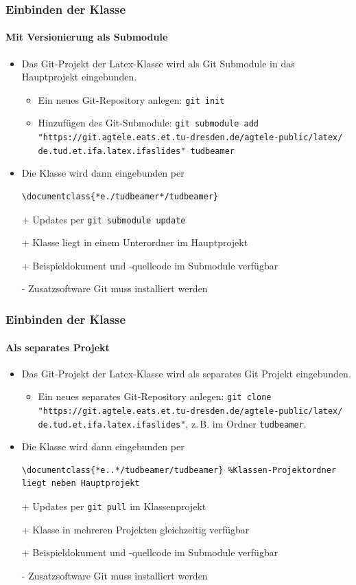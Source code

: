 \documentclass[german,notoc]{tudbeamer}%
\begin{document}
\begin{frame}[fragile]
	\frametitle{Einbinden der Klasse}
	\framesubtitle{Mit Versionierung als Submodule}
	\begin{itemize}
		\item Das Git-Projekt der Latex-Klasse wird als Git Submodule in das Hauptprojekt eingebunden.
		\begin{itemize}
			\item Ein neues Git-Repository anlegen: \texttt{git init}
			\item Hinzufügen des Git-Submodule: \texttt{git submodule add "https://git.agtele.eats.et.tu-dresden.de/agtele-public/latex/ de.tud.et.ifa.latex.ifaslides" tudbeamer}
		\end{itemize}
		\item Die Klasse wird dann eingebunden per
			\begin{lstlisting}[gobble=8,style=latex,numbers=none]
				\documentclass{*e./tudbeamer*/tudbeamer}
			\end{lstlisting}
	\end{itemize}	
	\begin{itemize}
		\item[+] Updates per \texttt{git submodule update}
		\item[+] Klasse liegt in einem Unterordner im Hauptprojekt
		\item[+] Beispieldokument und -quellcode im Submodule verfügbar
		\item[-] Zusatzsoftware Git muss installiert werden
	\end{itemize}
\end{frame}
\begin{frame}[fragile]
	\frametitle{Einbinden der Klasse}
	\framesubtitle{Als separates Projekt}

	\begin{itemize}
		\item Das Git-Projekt der Latex-Klasse wird als separates Git Projekt eingebunden.
		\begin{itemize}
			\item Ein neues separates Git-Repository anlegen: 
				\texttt{git clone "https://git.agtele.eats.et.tu-dresden.de/agtele-public/latex/ de.tud.et.ifa.latex.ifaslides"}, z.\,B. im Ordner \texttt{tudbeamer}.
		\end{itemize}
		\item Die Klasse wird dann eingebunden per
			\begin{lstlisting}[gobble=8,style=latex,numbers=none]
				\documentclass{*e..*/tudbeamer/tudbeamer} %Klassen-Projektordner liegt neben Hauptprojekt
			\end{lstlisting}
	\end{itemize}	
	\begin{itemize}
		\item[+] Updates per \texttt{git pull} im Klassenprojekt
		\item[+] Klasse in mehreren Projekten gleichzeitig verfügbar
		\item[+] Beispieldokument und -quellcode im Submodule verfügbar
		\item[-] Zusatzsoftware Git muss installiert werden
	\end{itemize}
\end{frame}
\end{document}
